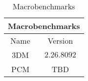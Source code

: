 \begin{table}[H]
    \centering
    \begin{tabular}{|| c | c ||}
    \hline
    \multicolumn{2}{||c||}{Macrobenchmarks} \\ [0.5ex] \hline\hline
    Name & Version \\\hline
    3DM & $2.26.8092$ \\
    PCM & TBD \\\hline
    \end{tabular}
    \caption{Macrobenchmarks}
    \label{tab:macrobenchmarks}
\end{table}